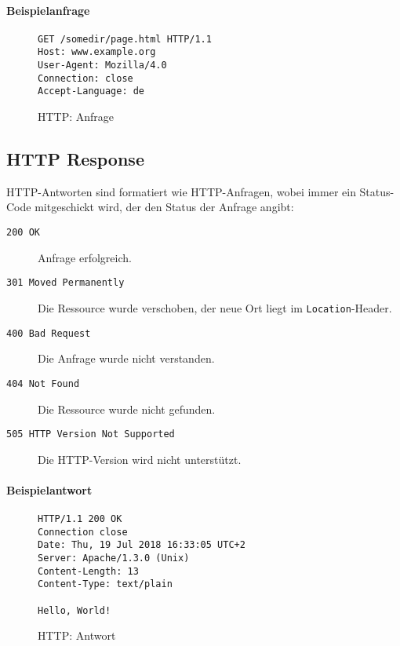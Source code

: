             \paragraph{Beispielanfrage}
                \begin{figure}[H]
                	\centering
                	\begin{lstlisting}
GET /somedir/page.html HTTP/1.1
Host: www.example.org
User-Agent: Mozilla/4.0
Connection: close
Accept-Language: de
                	\end{lstlisting}
                	\caption{HTTP: Anfrage}
                \end{figure}

        \subsection{HTTP Response}
            HTTP-Antworten sind formatiert wie HTTP-Anfragen, wobei immer ein Status-Code mitgeschickt wird, der den Status der Anfrage angibt:
            \begin{description}
            	\item[\texttt{200 OK}] Anfrage erfolgreich.
            	\item[\texttt{301 Moved Permanently}] Die Ressource wurde verschoben, der neue Ort liegt im \texttt{Location}-Header.
            	\item[\texttt{400 Bad Request}] Die Anfrage wurde nicht verstanden.
            	\item[\texttt{404 Not Found}] Die Ressource wurde nicht gefunden.
            	\item[\texttt{505 HTTP Version Not Supported}] Die HTTP-Version wird nicht unterstützt.
            \end{description}
            
            \paragraph{Beispielantwort}
                \begin{figure}[H]
                	\centering
                	\begin{lstlisting}
HTTP/1.1 200 OK
Connection close
Date: Thu, 19 Jul 2018 16:33:05 UTC+2
Server: Apache/1.3.0 (Unix)
Content-Length: 13
Content-Type: text/plain

Hello, World!
                	\end{lstlisting}
                	\caption{HTTP: Antwort}
                \end{figure}

